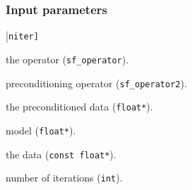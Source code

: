 \subsubsection*{Input parameters}
\begin{desclist}{\tt }{\quad}[\tt niter]
   \setlength\itemsep{0pt}
   \item[oper]  the operator (\texttt{sf\_operator}). 
   \item[prec]  preconditioning operator (\texttt{sf\_operator2}). 
   \item[p]     the preconditioned data (\texttt{float*}).  
   \item[x]     model (\texttt{float*}).  
   \item[dat]   the data (\texttt{const float*}).  
   \item[niter] number of iterations (\texttt{int}).  
\end{desclist}




